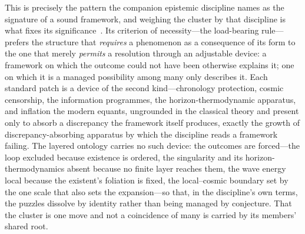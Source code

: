\documentclass[11pt,a4paper]{article}
\theoremstyle{plain}
\theoremstyle{definition}
\theoremstyle{remark}
\begin{document}
This is precisely the pattern the companion epistemic discipline names as the signature of a sound framework, and weighing the cluster by that discipline is what fixes its significance~\cite{JanzenShadowExistence}. Its criterion of necessity---the load-bearing rule---prefers the structure that \emph{requires} a phenomenon as a consequence of its form to the one that merely \emph{permits} a resolution through an adjustable device: a framework on which the outcome could not have been otherwise explains it; one on which it is a managed possibility among many only describes it. Each standard patch is a device of the second kind---chronology protection, cosmic censorship, the information programmes, the horizon-thermodynamic apparatus, and inflation the modern equants, ungrounded in the classical theory and present only to absorb a discrepancy the framework itself produces, exactly the growth of discrepancy-absorbing apparatus by which the discipline reads a framework failing. The layered ontology carries no such device: the outcomes are forced---the loop excluded because existence is ordered, the singularity and its horizon-thermodynamics absent because no finite layer reaches them, the wave energy local because the existent's foliation is fixed, the local--cosmic boundary set by the one scale that also sets the expansion---so that, in the discipline's own terms, the puzzles dissolve by identity rather than being managed by conjecture. That the cluster is one move and not a coincidence of many is carried by its members' shared root.
\end{document}
